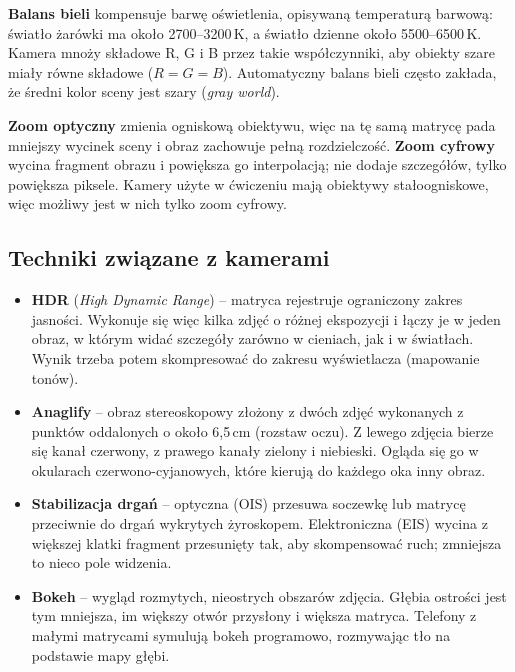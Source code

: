 \textbf{Balans bieli} kompensuje barwę oświetlenia, opisywaną temperaturą barwową: światło żarówki
ma około 2700--3200\,K, a światło dzienne około 5500--6500\,K. Kamera mnoży składowe R, G i B przez
takie współczynniki, aby obiekty szare miały równe składowe ($R = G = B$). Automatyczny balans
bieli często zakłada, że średni kolor sceny jest szary (\emph{gray world}).

\textbf{Zoom optyczny} zmienia ogniskową obiektywu, więc na tę samą matrycę pada mniejszy wycinek
sceny i obraz zachowuje pełną rozdzielczość. \textbf{Zoom cyfrowy} wycina fragment obrazu i
powiększa go interpolacją; nie dodaje szczegółów, tylko powiększa piksele. Kamery użyte w ćwiczeniu
mają obiektywy stałoogniskowe, więc możliwy jest w nich tylko zoom cyfrowy.

\subsection{Techniki związane z kamerami}
\begin{itemize}
  \item \textbf{HDR} (\emph{High Dynamic Range}) -- matryca rejestruje ograniczony zakres jasności.
    Wykonuje się więc kilka zdjęć o różnej ekspozycji i łączy je w jeden obraz, w którym widać
    szczegóły zarówno w cieniach, jak i w światłach. Wynik trzeba potem skompresować do zakresu
    wyświetlacza (mapowanie tonów).
  \item \textbf{Anaglify} -- obraz stereoskopowy złożony z dwóch zdjęć wykonanych z punktów
    oddalonych o około 6,5\,cm (rozstaw oczu). Z lewego zdjęcia bierze się kanał czerwony,
    z prawego kanały zielony i niebieski. Ogląda się go w okularach czerwono-cyjanowych, które
    kierują do każdego oka inny obraz.
  \item \textbf{Stabilizacja drgań} -- optyczna (OIS) przesuwa soczewkę lub matrycę przeciwnie do
    drgań wykrytych żyroskopem. Elektroniczna (EIS) wycina z większej klatki fragment przesunięty
    tak, aby skompensować ruch; zmniejsza to nieco pole widzenia.
  \item \textbf{Bokeh} -- wygląd rozmytych, nieostrych obszarów zdjęcia. Głębia ostrości jest tym
    mniejsza, im większy otwór przysłony i większa matryca. Telefony z małymi matrycami symulują
    bokeh programowo, rozmywając tło na podstawie mapy głębi.
\end{itemize}

